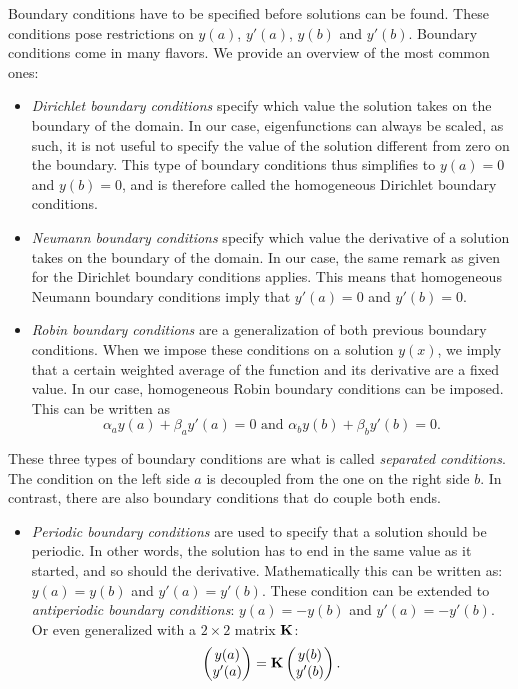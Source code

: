 Boundary conditions have to be specified before solutions can be found. These conditions pose restrictions on $y(a)$, $y'(a)$, $y(b)$ and $y'(b)$. Boundary conditions come in many flavors. We provide an overview of the most common ones:
\begin{itemize}
    \item \emph{Dirichlet boundary conditions} specify which value the solution takes on the boundary of the domain. In our case, eigenfunctions can always be scaled, as such, it is not useful to specify the value of the solution different from zero on the boundary. This type of boundary conditions thus simplifies to $y(a) = 0$ and $y(b) = 0$, and is therefore called the homogeneous Dirichlet boundary conditions.
    \item \emph{Neumann boundary conditions} specify which value the derivative of a solution takes on the boundary of the domain. In our case, the same remark as given for the Dirichlet boundary conditions applies. This means that homogeneous Neumann boundary conditions imply that $y'(a) = 0$ and $y'(b) = 0$.
    \item \emph{Robin boundary conditions} are a generalization of both previous boundary conditions. When we impose these conditions on a solution $y(x)$, we imply that a certain weighted average of the function and its derivative are a fixed value. In our case, homogeneous Robin boundary conditions can be imposed. This can be written as
          $$
              \alpha_a y(a) + \beta_a y'(a) = 0 \text{ and } \alpha_b y(b) + \beta_b y'(b) = 0  \text{.}
          $$
\end{itemize}
These three types of boundary conditions are what is called \emph{separated conditions}. The condition on the left side $a$ is decoupled from the one on the right side $b$. In contrast, there are also boundary conditions that do couple both ends.
\begin{itemize}
    \item \emph{Periodic boundary conditions} are used to specify that a solution should be periodic. In other words, the solution has to end in the same value as it started, and so should the derivative. Mathematically this can be written as: $y(a) = y(b)$ and $y'(a) = y'(b)$. These condition can be extended to \emph{antiperiodic boundary conditions}: $y(a) = -y(b)$ and $y'(a) = -y'(b)$. Or even generalized with a $2 \times 2$ matrix $\vb{K}$:
          $$
              \begin{pmatrix} y(a) \\ y'(a) \end{pmatrix} = \vb{K} \begin{pmatrix} y(b) \\ y'(b) \end{pmatrix}\text{.}
          $$
\end{itemize}

